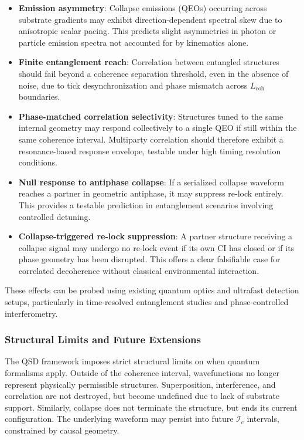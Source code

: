 \documentclass[preprints,article,submit,pdftex,moreauthors]{Definitions/mdpi}
\begin{document}
\begin{itemize}
  \item \textbf{Emission asymmetry}: Collapse emissions (QEOs) occurring across substrate gradients may exhibit direction-dependent spectral skew due to anisotropic scalar pacing. This predicts slight asymmetries in photon or particle emission spectra not accounted for by kinematics alone.
  
  \item \textbf{Finite entanglement reach}: Correlation between entangled structures should fail beyond a coherence separation threshold, even in the absence of noise, due to tick desynchronization and phase mismatch across \( L_{\text{coh}} \) boundaries.
  
  \item \textbf{Phase-matched correlation selectivity}: Structures tuned to the same internal geometry may respond collectively to a single QEO if still within the same coherence interval. Multiparty correlation should therefore exhibit a resonance-based response envelope, testable under high timing resolution conditions.
  
  \item \textbf{Null response to antiphase collapse}: If a serialized collapse waveform reaches a partner in geometric antiphase, it may suppress re-lock entirely. This provides a testable prediction in entanglement scenarios involving controlled detuning.
  
  \item \textbf{Collapse-triggered re-lock suppression}: A partner structure receiving a collapse signal may undergo no re-lock event if its own CI has closed or if its phase geometry has been disrupted. This offers a clear falsifiable case for correlated decoherence without classical environmental interaction.
\end{itemize}

These effects can be probed using existing quantum optics and ultrafast detection setups, particularly in time-resolved entanglement studies and phase-controlled interferometry.

\subsubsection{Structural Limits and Future Extensions}

The QSD framework imposes strict structural limits on when quantum formalisms apply. Outside of the coherence interval, wavefunctions no longer represent physically permissible structures. Superposition, interference, and correlation are not destroyed, but become undefined due to lack of substrate support. Similarly, collapse does not terminate the structure, but ends its current configuration. The underlying waveform may persist into future \( \mathcal{I}_c \) intervals, constrained by causal geometry.
\end{document}
